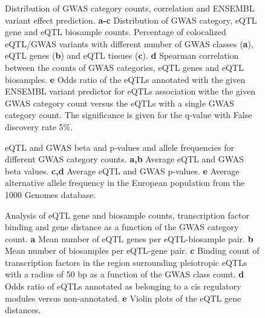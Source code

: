 \begin{backmatter}
\begin{figure}[!ht]
    \caption{Distribution of GWAS category counts, correlation and ENSEMBL variant effect prediction.
    \textbf{a-c} Distribution of GWAS category, eQTL gene and eQTL biosample counts.
    Percentage of colocalized eQTL/GWAS variants with different number of GWAS classes (\textbf{a}), eQTL genes (\textbf{b}) and eQTL tissues (\textbf{c}).
    \textbf{d} Spearman correlation between the counts of GWAS categories, eQTL genes and eQTL biosamples.
    \textbf{e} Odds ratio of the eQTLs annotated with the given ENSEMBL variant predictor
    for eQTLs association withe the given GWAS category count versus the eQTLs with a single GWAS category count.
    The significance is given for the q-value with False discovery rate 5\%.
    }
    \label{fig:3}
\end{figure}

%
%

\begin{figure}[!ht]
    \caption{
    eQTL and GWAS beta and p-values and allele frequencies for different GWAS category counts.
    \textbf{a,b} Average eQTL and GWAS beta values.
    \textbf{c,d} Average eQTL and GWAS p-values.
    \textbf{e} Average alternative allele frequency in the European population from the 1000 Genomes database.
    }
    \label{fig:4}
\end{figure}

%
%

\begin{figure}[!ht]
    \caption{
    Analysis of eQTL gene and biosample counts, transcription factor binding and gene distance as a function of the GWAS category count.
    \textbf{a} Mean number of eQTL genes per eQTL-biosample pair.
    \textbf{b} Mean number of biosamples per eQTL-gene pair.
    \textbf{c} Binding count of transcription factors in the region surrounding pleiotropic eQTLs with a radius of 50 bp as a function of the GWAS class count.
    \textbf{d} Odds ratio of eQTLs annotated as belonging to a cis regulatory modules versus non-annotated.
    \textbf{e} Violin plots of the eQTL gene distances.
    }
    \label{fig:5}
\end{figure}


\end{backmatter}
